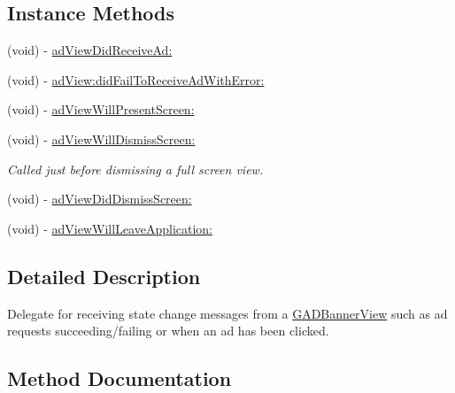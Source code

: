 \subsection*{Instance Methods}
\begin{DoxyCompactItemize}
\item 
(void) -\/ \hyperlink{protocolGADBannerViewDelegate-p_ae5529f9b6f571c937a4d56bfc7a4b5cc}{ad\+View\+Did\+Receive\+Ad\+:}
\item 
(void) -\/ \hyperlink{protocolGADBannerViewDelegate-p_a48ba2498ed7b71a3b2e67d0ba857841f}{ad\+View\+:did\+Fail\+To\+Receive\+Ad\+With\+Error\+:}
\item 
(void) -\/ \hyperlink{protocolGADBannerViewDelegate-p_a00e5555f09391fd2d50f38b7c19d0f36}{ad\+View\+Will\+Present\+Screen\+:}
\item 
\mbox{\label{protocolGADBannerViewDelegate-p_aaff1af046941042f0168a3d60f4c8e2b}} 
(void) -\/ \hyperlink{protocolGADBannerViewDelegate-p_aaff1af046941042f0168a3d60f4c8e2b}{ad\+View\+Will\+Dismiss\+Screen\+:}
\begin{DoxyCompactList}\small\item\em Called just before dismissing a full screen view. \end{DoxyCompactList}\item 
(void) -\/ \hyperlink{protocolGADBannerViewDelegate-p_a9f7c454662ab86060cc65cdd76f73efd}{ad\+View\+Did\+Dismiss\+Screen\+:}
\item 
(void) -\/ \hyperlink{protocolGADBannerViewDelegate-p_a68efb1e873d082dcf8fbbe94ccd7fb64}{ad\+View\+Will\+Leave\+Application\+:}
\end{DoxyCompactItemize}


\subsection{Detailed Description}
Delegate for receiving state change messages from a \hyperlink{interfaceGADBannerView}{G\+A\+D\+Banner\+View} such as ad requests succeeding/failing or when an ad has been clicked. 

\subsection{Method Documentation}
\mbox{\label{protocolGADBannerViewDelegate-p_a48ba2498ed7b71a3b2e67d0ba857841f}} 

